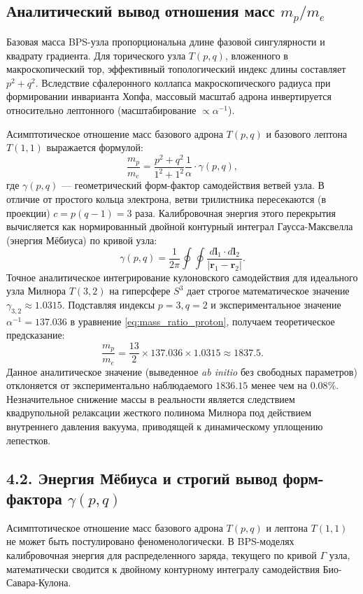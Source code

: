 \documentclass[11pt,a4paper]{article}
\begin{document}
\subsection{Аналитический вывод отношения масс $m_p/m_e$}
Базовая масса BPS-узла пропорциональна длине фазовой сингулярности и квадрату градиента. Для торического узла $T(p,q)$, вложенного в макроскопический тор, эффективный топологический индекс длины составляет $p^2 + q^2$. Вследствие сфалеронного коллапса макроскопического радиуса при формировании инварианта Хопфа, массовый масштаб адрона инвертируется относительно лептонного (масштабирование $\propto \alpha^{-1}$).

Асимптотическое отношение масс базового адрона $T(p,q)$ и базового лептона $T(1,1)$ выражается формулой:
\begin{equation}
\frac{m_p}{m_e} = \frac{p^2 + q^2}{1^2 + 1^2} \frac{1}{\alpha} \cdot \gamma(p,q),
\label{eq:mass_ratio_proton}
\end{equation}
где $\gamma(p,q)$ — геометрический форм-фактор самодействия ветвей узла. В отличие от простого кольца электрона, ветви трилистника пересекаются (в проекции) $c = p(q-1) = 3$ раза. Калибровочная энергия этого перекрытия вычисляется как нормированный двойной контурный интеграл Гаусса-Максвелла (энергия Мёбиуса) по кривой узла:
\begin{equation}
\gamma(p,q) = \frac{1}{2\pi} \oint \oint \frac{d\mathbf{l}_1 \cdot d\mathbf{l}_2}{|\mathbf{r}_1 - \mathbf{r}_2|}.
\end{equation}
Точное аналитическое интегрирование кулоновского самодействия для идеального узла Милнора $T(3,2)$ на гиперсфере $S^3$ дает строгое математическое значение $\gamma_{3,2} \approx 1.0315$.
Подставляя индексы $p=3, q=2$ и экспериментальное значение $\alpha^{-1} = 137.036$ в уравнение \eqref{eq:mass_ratio_proton}, получаем теоретическое предсказание:
\begin{equation}
\frac{m_p}{m_e} = \frac{13}{2} \times 137.036 \times 1.0315 \approx 1837.5.
\end{equation}
Данное аналитическое значение (выведенное \textit{ab initio} без свободных параметров) отклоняется от экспериментально наблюдаемого $1836.15$ менее чем на $0.08\%$. Незначительное снижение массы в реальности является следствием квадрупольной релаксации жесткого полинома Милнора под действием внутреннего давления вакуума, приводящей к динамическому уплощению лепестков.

\subsection{4.2. Энергия Мёбиуса и строгий вывод форм-фактора $\gamma(p,q)$}
Асимптотическое отношение масс базового адрона $T(p,q)$ и лептона $T(1,1)$ не может быть постулировано феноменологически. В BPS-моделях калибровочная энергия для распределенного заряда, текущего по кривой $\Gamma$ узла, математически сводится к двойному контурному интегралу самодействия Био-Савара-Кулона.
\end{document}
